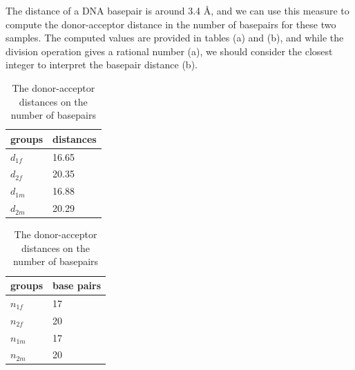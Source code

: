 \documentclass[a4paper,english,12pt,bibliography=totoc]{scrreprt}
\begin{document}
The distance of a DNA basepair is around 3.4 \AA \cite{alberts2014}, and we can use this measure to compute the donor-acceptor distance in the number of basepairs for these two samples.
The computed values are provided in tables (a) and (b), and while the division operation gives a rational number (a), we should consider the closest integer to interpret the basepair distance (b).

\begin{table}[H]
\centering
\begin{subtable}[t]{0.4\linewidth}
\centering
\begin{tabular}{ll}
\toprule
\textbf{groups} & \textbf{distances} \\
\midrule
$d_{1f}$ & 16.65\\
$d_{2f}$ & 20.35\\
$d_{1m}$ & 16.88\\
$d_{2m}$ & 20.29\\
\bottomrule
\end{tabular}
\caption{The donor-acceptor distance divided by basepair distance}
\end{subtable}
\hspace{2cm} %
\begin{subtable}[t]{0.4\linewidth}
\centering
\begin{tabular}{ll}
\toprule
\textbf{groups} & \textbf{base pairs} \\
\midrule
$n_{1f}$ & 17\\
$n_{2f}$ & 20\\
$n_{1m}$ & 17\\
$n_{2m}$ & 20\\
\bottomrule
\end{tabular}
\caption{The donor-acceptor distances on the number of basepairs}
\end{subtable}
\end{table}
\end{document}
